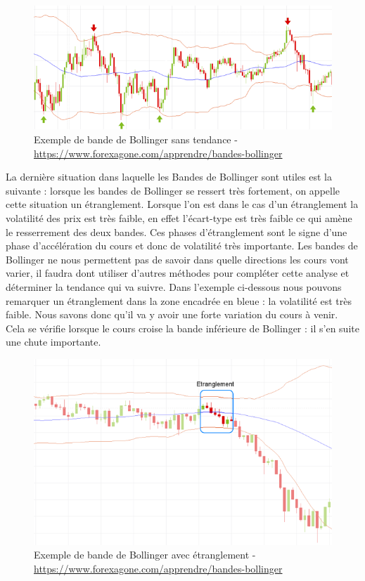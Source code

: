 \begin{figure}[H]
  \center
  \includegraphics[scale=0.5]{../graph/bollingerRange.png} 
  \caption{Exemple de bande de Bollinger sans tendance - \url{https://www.forexagone.com/apprendre/bandes-bollinger}}
\end{figure} 
 
La dernière situation dans laquelle les Bandes de Bollinger sont utiles est la suivante : lorsque les bandes de Bollinger se ressert très fortement, on appelle cette situation un étranglement. Lorsque l'on est dans le cas d'un étranglement la volatilité des prix est très faible, en effet l'écart-type est très faible ce qui amène le resserrement des deux bandes. Ces phases d'étranglement sont le signe d'une phase d'accélération du cours et donc de volatilité très importante. Les bandes de Bollinger ne nous permettent pas de savoir dans quelle directions les cours vont varier, il faudra dont utiliser d'autres méthodes pour compléter cette analyse et déterminer la tendance qui va suivre. Dans l'exemple ci-dessous nous pouvons remarquer un étranglement dans la zone encadrée en bleue : la volatilité est très faible. Nous savons donc qu'il va y avoir une forte variation du cours à venir. Cela se vérifie lorsque le cours croise la bande inférieure de Bollinger : il s'en suite une chute importante.   

\begin{figure}[H]
  \center
  \includegraphics[scale=0.5]{../graph/bollingerEtranglement.png} 
  \caption{Exemple de bande de Bollinger avec étranglement - \url{https://www.forexagone.com/apprendre/bandes-bollinger}}
\end{figure} 
 
